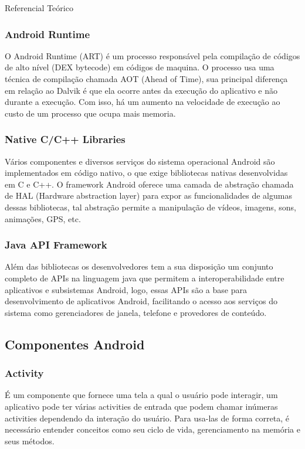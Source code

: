 \documentclass[
	12pt,				%
	openright,			%
	twoside,			%
	a4paper,			%
	english,			%
	french,				%
	spanish,			%
	brazil				%
	]{abntex2}
\begin{document}
\begin{chapter}{Referencial Teórico}
\subsubsection{Android Runtime}
O Android Runtime (ART) é um processo responsável pela compilação de códigos de alto nível (DEX bytecode) em códigos de maquina.
O processo usa uma técnica de compilação chamada AOT (Ahead of Time), sua principal diferença em relação ao Dalvik é que ela ocorre antes 
da execução do aplicativo e não durante a execução. Com isso, há um aumento na velocidade de execução ao custo de um processo que ocupa mais memoria.

\subsubsection{Native C/C++ Libraries}
Vários componentes e diversos serviços do sistema operacional Android são implementados em código nativo,
 o que exige bibliotecas nativas desenvolvidas em C e C++.
O framework Android oferece uma camada de abstração chamada de HAL (Hardware abstraction layer) para expor as funcionalidades de algumas dessas bibliotecas,
 tal abstração permite a manipulação de vídeos, imagens, sons, animações, GPS, etc.

\subsubsection{Java API Framework}
Além das bibliotecas os desenvolvedores tem a sua disposição um conjunto completo de APIs na linguagem java que permitem a interoperabilidade entre aplicativos e subsistemas Android, logo, essas APIs são a base para desenvolvimento de aplicativos Android, facilitando o acesso aos serviços do sistema como gerenciadores de janela, telefone e provedores de conteúdo.

\subsection{Componentes Android}
\subsubsection{Activity} 
É um componente que fornece uma tela a qual o usuário pode interagir, um aplicativo pode ter várias activities de entrada que podem chamar inúmeras activities dependendo da interação do usuário. Para usa-las de forma correta, é necessário entender conceitos como seu ciclo de vida, gerenciamento na memória e seus métodos. 


\end{chapter}
\end{document}
